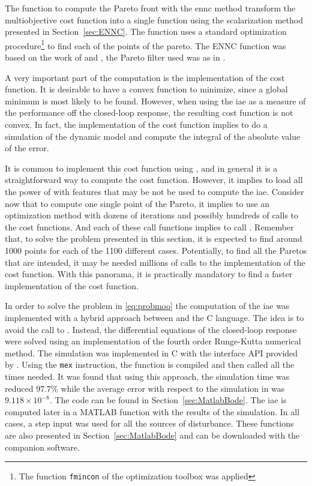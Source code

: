 The function to compute the Pareto front with the \gls{ennc} method transform the multiobjective cost function into a single function using the scalarization method presented in Section~\ref{sec:ENNC}. The function uses a standard optimization procedure\footnote{The function \texttt{fmincon} of the \matlab optimization toolbox was applied} to find each of the points of the pareto. The ENNC function was based on the work of \citet{Houska2011} and \citet{Logist2012}, the Pareto filter used was as in \citet{Cao2020}.

A very important part of the computation is the implementation of the cost function. It is desirable to have a convex function to minimize, since a global minimum is most likely to be found. However, when using the \gls{iae} as a measure of the performance off the closed-loop response, the resulting cost function is not convex. In fact, the implementation of the cost function implies to do a simulation of the dynamic model and compute the integral of the absolute value of the error.

It is common to implement this cost function using \simulink, and in general it is a straightforward way to compute the cost function. However, it implies to load all the power of \simulink with features that may be not be used to compute the \gls{iae}. Consider now that to compute one single point of the Pareto, it implies to use an optimization method with dozens of iterations and possibly hundreds of calls to the cost functions. And each of these call functions implies to call \simulink. Remember that, to solve the problem presented in this section, it is expected to find around 1000 points for each of the 1100 different cases. Potentially, to find all the Paretos that are intended, it may be needed millions of calls to the \simulink implementation of the cost function. With this panorama, it is practically mandatory to find a faster implementation of the cost function.

In order to solve the problem in \eqref{eq:probmoo} the computation of the \gls{iae} was implemented with a hybrid approach between \matlab{} and the C language. The idea is to avoid the call to \simulink. Instead, the differential equations of the closed-loop response were solved using an implementation of the fourth order Runge-Kutta numerical method. The simulation was implemented in C with the interface API provided by \matlab{}. Using the \texttt{mex} instruction, the function is compiled and then called all the times needed. It was found that using this approach, the simulation time was reduced $97.7\%$ while the average error with respect to the simulation in \simulink was $9.118\times10^{-8}$. The code can be found in Section~\ref{sec:MatlabBode}. The \gls{iae} is computed later in a MATLAB function with the results of the simulation. In all cases, a step input was used for all the sources of disturbance. These functions are also presented in Section~\ref{sec:MatlabBode} and can be downloaded with the companion software.

